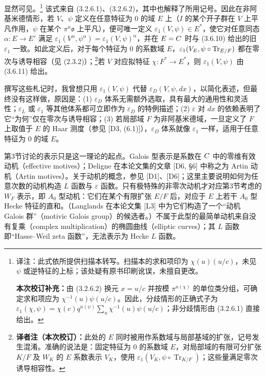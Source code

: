 显然可见。\footnote{译注：此式依所提供扫描本转写。扫描本的求和项印为 $\chi(u)(u/c)$，未见 $\psi$ 或逆特征的上标；该处疑有原书印刷讹误，未擅自更改。\par\textbf{本次校订补充：}由 (3.2.6.2) 换元 $x=u/c$ 并按模 $\pi^{a(\chi)}$ 的单位类分组，可确定求和项应为 $\chi^{-1}(u)\psi(u/c)$。因此，分歧情形的正确式子为 $\varepsilon_1(\chi,\psi)=\chi(c)q^{n(\psi)}\sum_u\chi^{-1}(u)\psi(u/c)$；非分歧情形由 (3.2.6.1) 直接给出。}
该式来自 (3.2.6.1)、(3.2.6.2)，其中也解释了所用记号。因此在非阿基米德情形，若 $V$、$\psi$ 定义在任意特征为 $0$ 的域 $E$ 上（$I$ 的某个开子群在 $V$ 上平凡作用，$\psi$ 在某个 $\pi^n\mathfrak o$ 上平凡），便可唯一定义 $\varepsilon_1(V,\psi)\in E^*$，使它对任意同态 $\alpha:E\to E'$ 满足 $\varepsilon_1(V^\alpha,\psi^\alpha)=\varepsilon_1(V,\psi)^\alpha$，并在 $E=C$ 时与 (3.6.10) 给出的旧 $\varepsilon_1$ 一致。如此定义后，对于每个特征为 $0$ 的系数域 $E$，$\varepsilon_1(V_E,\psi\circ\operatorname{Tr}_{E/F})$ 都在零次与诱导相容（见 (2.3.2)）；\footnote{\textbf{译者注（本次校订）：}此处的 $E$ 同时被用作系数域与局部基域的扩张，记号发生混淆。准确的说法是：固定特征为 $0$ 的系数域 $E$，对局部域的有限可分扩张 $K/F$ 及 $W_K$ 的 $E$ 系数表示 $V_K$，使用 $\varepsilon_1(V_K,\psi\circ\operatorname{Tr}_{K/F})$；这些量满足零次诱导相容性。}若 $V$ 对应拟特征 $\chi:F^*\to E^*$，则 $\varepsilon_1(V,\psi)$ 由 (3.6.11) 给出。

撰写这些札记时，我曾想只用 $\varepsilon_1(V,\psi)$ 代替 $\varepsilon_D(V,\psi,dx)$，以简化表述，但最终没有这样做，原因是：(1) $\varepsilon_D$ 体系无需额外选取，具有最大的通用性和灵活性；$\varepsilon_L$ 或 $\varepsilon_1$ 等其他体系都可立即作为 $\varepsilon_D$ 的特例描述；(2) $\varepsilon$ 对 $dx$ 的依赖表明了它“为何”仅在零次与诱导相容；(3) 若局部域 $F$ 为非阿基米德域，一旦定义了 $F$ 上取值于 $E$ 的 Haar 测度（参见 [D3, (6.1)]），$\varepsilon_D$ 体系就像 $\varepsilon_1$ 一样，适用于任意特征为 $0$ 的域 $E$。

第3节讨论的表示只是这一理论的起点。Galois 型表示是系数在 $C$ 中的零维有效动机（effective motives）；Deligne 在本论文集的文章 [D6, §6] 中称之为 Artin 动机（Artin motives）。关于动机的概念，参见 [D1]、[D6]；这里主要说明如何为任意次数的动机构造 $L$ 函数与 $\varepsilon$ 函数。只有极特殊的非零次动机才对应第3节考虑的 $W_F$ 表示，即 $A_0$ 型动机：它们在某个有限扩张 $E/F$ 后，对应于 $E$ 上若干 $A_0$ 型 Hecke 特征的直和。（Langlands 在本论文集 [L3] 中为它们构造了一个“动机 Galois 群”（motivic Galois group）的候选者。）不属于此型的最简单动机来自没有复乘（complex multiplication）的椭圆曲线（elliptic curves）；其 $L$ 函数即“Hasse--Weil zeta 函数”，无法表示为 Hecke $L$ 函数。


